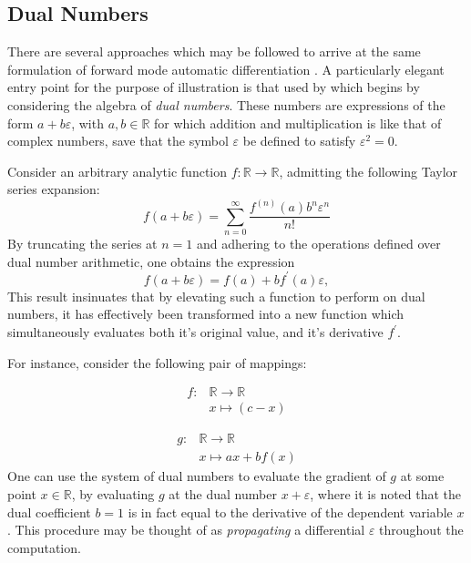 \subsection{Dual Numbers}\label{building-a-differentiable-model}

There are several approaches which may be followed to arrive at the same
formulation of forward mode automatic differentiation
\autocite{hoffmann2016hitchhiker}. A particularly elegant entry point
for the purpose of illustration is that used by
\textcite{pearlmutter2007lazy} which begins by considering the algebra
of \emph{dual numbers}. 
These numbers are expressions of the form
\(a + b\varepsilon\), with \(a,b \in \mathbb{R}\) for which addition
and multiplication is like that of complex numbers, save that the symbol
\(\varepsilon\) be defined to satisfy \(\varepsilon^2 = 0\).

Consider an arbitrary analytic function
\(f: \mathbb{R} \rightarrow \mathbb{R}\), admitting the following Taylor series expansion:
%
\[
f(a+b \varepsilon)=\sum_{n=0}^{\infty} \frac{f^{(n)}(a) b^{n} \varepsilon^{n}}{n !} 
\]
%
By truncating the series at \(n = 1\) and adhering to the operations
defined over dual number arithmetic, one obtains the expression
%
\[
f(a + b \varepsilon) = f(a) + bf^\prime (a) \varepsilon, 
\]
%
This result insinuates that by elevating such a function to perform on
dual numbers, it has effectively been transformed into a new function
which simultaneously evaluates both it's original value, and it's
derivative \(f^\prime\).

For instance, consider the following pair of mappings:

\[
\begin{aligned}
f: & \mathbb{R} \rightarrow \mathbb{R} \\
   & x \mapsto (c - x)
\end{aligned}
\]

\begin{equation}
\begin{aligned}
g: & \mathbb{R} \rightarrow \mathbb{R} \\
   & x \mapsto a x + b f(x)
\end{aligned}
\label{eq:dual-area}\end{equation}
%
One can use the system of dual numbers to evaluate the gradient of \(g\)
at some point \(x \in \mathbb{R}\), by evaluating \(g\) at the dual
number \(x + \varepsilon\), where it is noted that the dual coefficient
\(b = 1\) is in fact equal to the derivative of the dependent variable
\(x\). This procedure may be thought of as \emph{propagating} a
differential \(\varepsilon\) throughout the computation.


